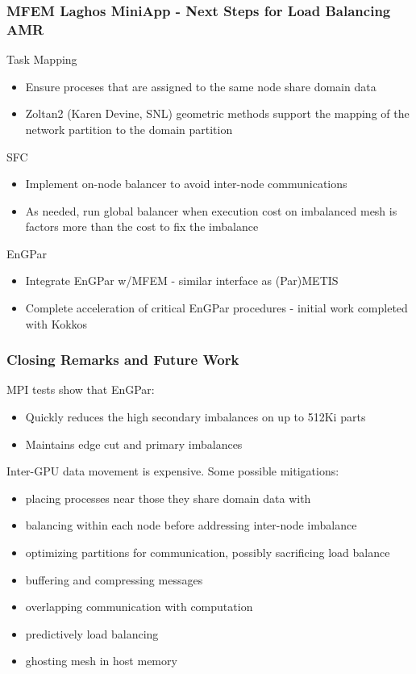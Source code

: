 \documentclass[aspectratio=169]{beamer}
\begin{document}
\begin{frame}

  \frametitle{MFEM Laghos MiniApp - Next Steps for Load Balancing AMR}
  Task Mapping
  \begin{itemize}
    \item Ensure proceses that are assigned to the same node share domain data
    \item Zoltan2 (Karen Devine, SNL) geometric methods support the mapping of
      the network partition to the domain partition
  \end{itemize}
  SFC
  \begin{itemize}
    \item Implement on-node balancer to avoid inter-node communications
    \item As needed, run global balancer when execution cost on
      imbalanced mesh is factors more than the cost to fix the imbalance
  \end{itemize}
  EnGPar
  \begin{itemize}
    \item Integrate EnGPar w/MFEM - similar interface as (Par)METIS
    \item Complete acceleration of critical EnGPar procedures - initial work
      completed with Kokkos
  \end{itemize}
\end{frame}

\begin{frame}
  \frametitle{Closing Remarks and Future Work}
  MPI tests show that EnGPar:
  \begin{itemize}
    \item Quickly reduces the high secondary imbalances on up to 512Ki parts
    \item Maintains edge cut and primary imbalances
  \end{itemize}
  Inter-GPU data movement is expensive. Some possible mitigations:
  \begin{itemize}
    \item placing processes near those they share domain data with
    \item balancing within each node before addressing inter-node imbalance
    \item optimizing partitions for communication, possibly sacrificing load balance
    \item buffering and compressing messages
    \item overlapping communication with computation
    \item predictively load balancing
    \item ghosting mesh in host memory
  \end{itemize}
\end{frame}
\end{document}
